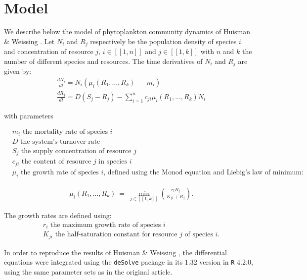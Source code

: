\section{Model}

We describe below the model of phytoplankton community dynamics of Huisman \& Weissing \cite{1999:Huisman}. Let $N_i$ and $R_j$ respectively be the population density of species $i$ and concentration of resource $j$, $i\in[\![1,n]\!]$ and $j\in[\![1,k]\!]$ with $n$ and $k$ the number of different species and resources. The time derivatives of $N_i$ and $R_j$ are given by: \\

\begin{align}
	& \frac{dN_i}{dt}= N_i(\mu_i(R_1,...,R_k)~-~m_i)\\
	& \frac{dR_j}{dt}= D(S_j-R_j) - \sum_{i=1}^n c_{ji} 
\mu_i(R_1,...,R_k)N_i
\end{align}

with parameters

\begin{align*}
& m_i \text{ the mortality rate of species $i$}\\
& D \text{ the system's turnover rate}\\
& S_j \text{ the supply concentration of resource $j$}\\
& c_{ji} \text{ the content of resource $j$ in species $i$}\\
& \mu_i \text{ the growth rate of species $i$, defined using the Monod equation and Liebig's law of minimum: }
\end{align*}

\begin{align}
&\mu_i(R_1,...,R_k)~=~\min_{j\in[\![1,k]\!]} \left( \frac{r_iR_j}{K_{ji}+R_j} \right). 
\end{align}

The growth rates are defined using: 
\begin{align*}
&r_i \text{ the maximum growth rate of species $i$}\\
&K_{	ji} \text{ the half-saturation constant for resource $j$ of species $i$.}
\end{align*}

In order to reproduce the results of Huisman \& Weissing \cite{1999:Huisman}, the differential equations were integrated using the \texttt{deSolve} \cite{deSolve} package in its 1.32 version in \texttt{R} \cite{R} 4.2.0, using the same parameter sets as in the original article.\\

